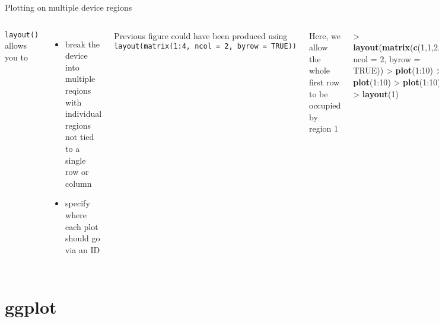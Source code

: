 \documentclass[10pt,ignorenonframetext,compress, aspectratio=169]{beamer}
\newenvironment{Shaded}{\begin{snugshade}}{\end{snugshade}}
\newcommand{\KeywordTok}[1]{\textcolor[rgb]{0.13,0.29,0.53}{\textbf{{#1}}}}
\newcommand{\DataTypeTok}[1]{\textcolor[rgb]{0.13,0.29,0.53}{{#1}}}
\newcommand{\DecValTok}[1]{\textcolor[rgb]{0.00,0.00,0.81}{{#1}}}
\newcommand{\StringTok}[1]{\textcolor[rgb]{0.31,0.60,0.02}{{#1}}}
\newcommand{\OtherTok}[1]{\textcolor[rgb]{0.56,0.35,0.01}{{#1}}}
\newcommand{\NormalTok}[1]{{#1}}
\providecommand{\tightlist}{%
  \setlength{\itemsep}{0pt}\setlength{\parskip}{0pt}}
\newcommand{\columnsbegin}{\begin{columns}}
\newcommand{\columnsend}{\end{columns}}
\begin{document}
\begin{frame}[fragile]{Plotting on multiple device regions}

\columnsbegin
{}

\texttt{layout()} allows you to

\begin{itemize}
\tightlist
\item
  break the device into multiple reqions with individual regions not
  tied to a single row or column
\item
  specify where each plot should go via an ID
\end{itemize}

Previous figure could have been produced using
\texttt{layout(matrix(1:4,\ ncol\ =\ 2,\ byrow\ =\ TRUE))}

Here, we allow the whole first row to be occupied by region 1


\begin{Shaded}
\begin{Highlighting}[]
\NormalTok{>}\StringTok{ }\KeywordTok{layout}\NormalTok{(}\KeywordTok{matrix}\NormalTok{(}\KeywordTok{c}\NormalTok{(}\DecValTok{1}\NormalTok{,}\DecValTok{1}\NormalTok{,}\DecValTok{2}\NormalTok{,}\DecValTok{3}\NormalTok{), }\DataTypeTok{ncol =} \DecValTok{2}\NormalTok{, }\DataTypeTok{byrow =} \OtherTok{TRUE}\NormalTok{))}
\NormalTok{>}\StringTok{ }\KeywordTok{plot}\NormalTok{(}\DecValTok{1}\NormalTok{:}\DecValTok{10}\NormalTok{)}
\NormalTok{>}\StringTok{ }\KeywordTok{plot}\NormalTok{(}\DecValTok{1}\NormalTok{:}\DecValTok{10}\NormalTok{)}
\NormalTok{>}\StringTok{ }\KeywordTok{plot}\NormalTok{(}\DecValTok{1}\NormalTok{:}\DecValTok{10}\NormalTok{)}
\NormalTok{>}\StringTok{ }\KeywordTok{layout}\NormalTok{(}\DecValTok{1}\NormalTok{)}
\end{Highlighting}
\end{Shaded}

\begin{center}\texttt{[image: 02-learning-r\_files/figure-beamer/layout-1]} \end{center}

\columnsend

\end{frame}

\section{ggplot}\label{ggplot}
\end{document}
